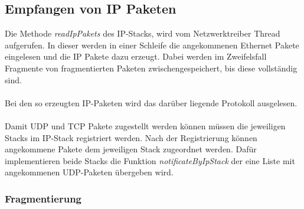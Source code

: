 \subsection{Empfangen von IP Paketen}

Die Methode \textit{readIpPakets} des IP-Stacks, wird vom Netzwerktreiber Thread aufgerufen. In dieser werden in einer Schleife die angekommenen Ethernet Pakete eingelesen und die IP Pakete dazu erzeugt. Dabei werden im Zweifelsfall Fragmente von fragmentierten Paketen zwischengespeichert, bis diese vollständig sind. \\\\
Bei den so erzeugten IP-Paketen wird das darüber liegende Protokoll ausgelesen.\\\\
Damit UDP und TCP Pakete zugestellt werden können müssen die jeweiligen Stacks im IP-Stack registriert werden. Nach der Registrierung können angekommene  Pakete dem jeweiligen Stack zugeordnet werden. Dafür implementieren beide Stacks die Funktion \textit{notificateByIpStack} der eine Liste mit angekommenen UDP-Paketen übergeben wird. 

\subsubsection{Fragmentierung}

